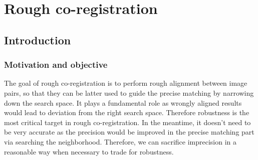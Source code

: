 
\chapter{Rough co-registration}
\label{chap:RoughCoReg}
\minitoc

\section{Introduction}
\subsection{Motivation and objective}
The goal of rough co-registration is to perform rough alignment between image pairs, so that they can be latter used to guide the precise matching by narrowing down the search space. It plays a fundamental role as wrongly aligned results would lead to deviation from the right search space. Therefore robustness is the most critical target in rough co-registration. In the meantime, it doesn't need to be very accurate as the precision would be improved in the precise matching part via searching the neighborhood. Therefore, we can sacrifice imprecision in a reasonable way when necessary to trade for robustness.\\

